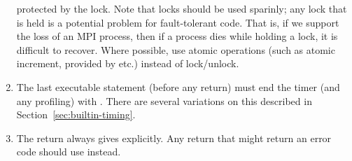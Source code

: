 \documentclass{article}
\begin{document}
\begin{enumerate}
protected by the lock.  Note that locks should be used sparinly; any
lock that is held is a potential problem for fault-tolerant code.
That is, if we support the loss of an MPI process, then if a process
dies while holding a lock, it is difficult to recover.  Where
possible, use atomic operations (such as atomic increment, provided by
 etc.) instead of lock/unlock.  
%
%
\item The last executable statement (before any return) must end the
timer (and any profiling) with .  There are
several variations on this described in Section~\ref{sec:builtin-timing}.
\item The return always gives  explicitly.  Any return that
  might return an error code should use  instead.  
\end{enumerate}
\end{document}

